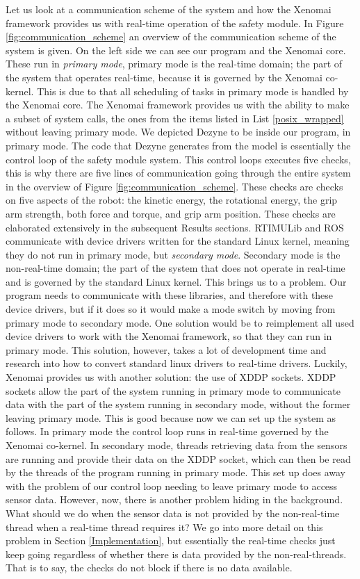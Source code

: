 \documentclass[12pt]{scrreprt}
\begin{document}
Let us look at a communication scheme of the system and how the Xenomai framework provides us with real-time operation of the safety module. In Figure \ref{fig:communication_scheme} an overview of the communication scheme of the system is given. On the left side we can see our program and the Xenomai core. These run in \textit{primary mode}, primary mode is the real-time domain; the part of the system that operates real-time, because it is governed by the Xenomai co-kernel. This is due to that all scheduling of tasks in primary mode is handled by the Xenomai core. The Xenomai framework provides us with the ability to make a subset of system calls, the ones from the items listed in List \ref{posix_wrapped} without leaving primary mode. We depicted Dezyne to be inside our program, in primary mode. The code that Dezyne generates from the model is essentially the control loop of the safety module system. This control loops executes five checks, this is why there are five lines of communication going through the entire system in the overview of Figure \ref{fig:communication_scheme}. These checks are checks on five aspects of the robot: the kinetic energy, the rotational energy, the grip arm strength, both force and torque, and grip arm position. These checks are elaborated extensively in the subsequent Results sections. RTIMULib and ROS communicate with device drivers written for the standard Linux kernel, meaning they do not run in primary mode, but \textit{secondary mode}. Secondary mode is the non-real-time domain; the part of the system that does not operate in real-time and is governed by the standard Linux kernel. This brings us to a problem. Our program needs to communicate with these libraries, and therefore with these device drivers, but if it does so it would make a mode switch by moving from primary mode to secondary mode. One solution would be to reimplement all used device drivers to work with the Xenomai framework, so that they can run in primary mode. This solution, however, takes a lot of development time and research into how to convert standard linux drivers to real-time drivers. Luckily, Xenomai provides us with another solution: the use of XDDP sockets. XDDP sockets allow the part of the system running in primary mode to communicate data with the part of the system running in secondary mode, without the former leaving primary mode. This is good because now we can set up the system as follows. In primary mode the control loop runs in real-time governed by the Xenomai co-kernel. In secondary mode, threads retrieving data from the sensors are running and provide their data on the XDDP socket, which can then be read by the threads of the program running in primary mode. This set up does away with the problem of our control loop needing to leave primary mode to access sensor data. However, now, there is another problem hiding in the background. What should we do when the sensor data is not provided by the non-real-time thread when a real-time thread requires it? We go into more detail on this problem in Section \ref{Implementation}, but essentially the real-time checks just keep going regardless of whether there is data provided by the non-real-threads. That is to say, the checks do not block if there is no data available.
\end{document}
